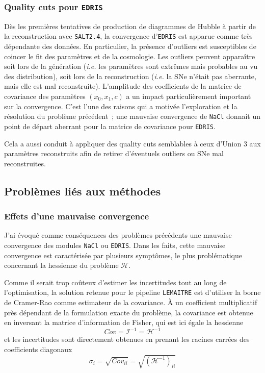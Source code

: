 \documentclass{book}
\def\lemaitre{\texttt{LEMAITRE}\xspace}
\def\nacl{\texttt{NaCl}\xspace}
\def\edris{\texttt{EDRIS}\xspace}
\def\saltd{\texttt{SALT2.4}\xspace}
\let\mcl\mathcal
\begin{document}
\subsubsection{Quality cuts pour \edris}
\label{sec:qc_edris}
Dès les premières tentatives de production de diagrammes de Hubble à partir de la reconstruction avec \saltd, la convergence d'\edris est apparue comme très dépendante des données. En particulier, la présence d'outliers est susceptibles de coincer le fit des paramètres et de la cosmologie. Les outliers peuvent apparaître soit lors de la génération (\textit{i.e.} les paramètres sont extrêmes mais probables au vu des distribution), soit lors de la reconstruction (\textit{i.e.} la SNe n'était pas aberrante, mais elle est mal reconstruite). L'amplitude des coefficients de la matrice de covariance des paramètres $(x_0, x_1, c)$ a un impact particulièrement important sur la convergence. C'est l'une des raisons qui a motivée l'exploration et la résolution du problème précédent~; une mauvaise convergence de \nacl donnait un point de départ aberrant pour la matrice de covariance pour \edris.

Cela a aussi conduit à appliquer des quality cuts semblables à ceux d'Union 3 aux paramètres reconstruits afin de retirer d'éventuels outliers ou SNe mal reconstruites.

\subsection{Problèmes liés aux méthodes}

\subsubsection{Effets d'une mauvaise convergence }

J'ai évoqué comme conséquences des problèmes précédents une mauvaise convergence des modules \nacl ou \edris. Dans les faits, cette mauvaise convergence est caractérisée par plusieurs symptômes, le plus problématique concernant la hessienne du problème $\mcl H$.

Comme il serait trop coûteux d'estimer les incertitudes tout au long de l'optimisation, la solution retenue pour le pipeline \lemaitre est d'utiliser la borne de Cramer-Rao comme estimateur de la covariance. À un coefficient multiplicatif près dépendant de la formulation exacte du problème, la covariance est obtenue en inversant la matrice d'information de Fisher, qui est ici égale la hessienne 
\begin{equation}
	Cov = \mcl I^{-1} = \mcl H^{-1}
\end{equation}
et les incertitudes sont directement obtenues en prenant les racines carrées des coefficients diagonaux
\begin{equation}
	\sigma_i = \sqrt{Cov_{ii}} = \sqrt{(\mcl H^{-1})_{ii}}
\end{equation}
\end{document}
